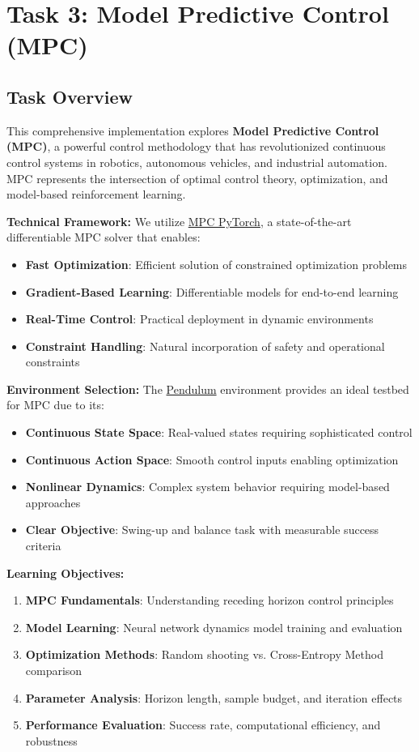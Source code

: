 \section{Task 3: Model Predictive Control (MPC)}

\subsection{Task Overview} 
This comprehensive implementation explores \textbf{Model Predictive Control (MPC)}, a powerful control methodology that has revolutionized continuous control systems in robotics, autonomous vehicles, and industrial automation. MPC represents the intersection of optimal control theory, optimization, and model-based reinforcement learning.

\textbf{Technical Framework:} We utilize \href{https://locuslab.github.io/mpc.pytorch/}{MPC PyTorch}, a state-of-the-art differentiable MPC solver that enables:
\begin{itemize}
    \item \textbf{Fast Optimization}: Efficient solution of constrained optimization problems
    \item \textbf{Gradient-Based Learning}: Differentiable models for end-to-end learning
    \item \textbf{Real-Time Control}: Practical deployment in dynamic environments
    \item \textbf{Constraint Handling}: Natural incorporation of safety and operational constraints
\end{itemize}

\textbf{Environment Selection:} The \href{https://gymnasium.farama.org/environments/classic_control/pendulum/}{Pendulum} environment provides an ideal testbed for MPC due to its:
\begin{itemize}
    \item \textbf{Continuous State Space}: Real-valued states requiring sophisticated control
    \item \textbf{Continuous Action Space}: Smooth control inputs enabling optimization
    \item \textbf{Nonlinear Dynamics}: Complex system behavior requiring model-based approaches
    \item \textbf{Clear Objective}: Swing-up and balance task with measurable success criteria
\end{itemize}

\textbf{Learning Objectives:}
\begin{enumerate}
    \item \textbf{MPC Fundamentals}: Understanding receding horizon control principles
    \item \textbf{Model Learning}: Neural network dynamics model training and evaluation
    \item \textbf{Optimization Methods}: Random shooting vs. Cross-Entropy Method comparison
    \item \textbf{Parameter Analysis}: Horizon length, sample budget, and iteration effects
    \item \textbf{Performance Evaluation}: Success rate, computational efficiency, and robustness
\end{enumerate}

